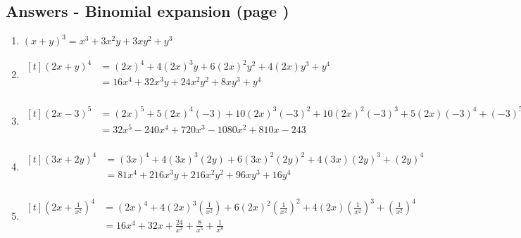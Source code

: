 \documentclass[../main.tex]{subfiles}
\begin{document}
\subsection*{Answers - Binomial expansion (page \pageref{Binomial Expansion})}
\label{Binomial expansion answers}

\begin{enumerate}
    \item \( (x+y)^3 = x^3 + 3x^2 y + 3xy^2 +y^3 \)
    \item 
    $
    \!
    \begin{aligned}[t]
     (2x+y)^4 
        &= (2x)^4 + 4(2x)^3y + 6(2x)^2y^2 + 4(2x)y^3 + y^4 \\
        &= 16x^4 + 32x^3y + 24x^2y^2 + 8xy^3 + y^4 \\
    \end{aligned}
    $ 
    \item 
    $
    \!
    \begin{aligned}[t]
     (2x-3)^5 
        &= (2x)^5 + 5(2x)^4(-3) + 10(2x)^3(-3)^2 + 10(2x)^2(-3)^3 + 5(2x)(-3)^4 + (-3)^5 \\
        &= 32x^5 -240x^4 +720x^3 - 1080x^2 + 810x - 243 \\
    \end{aligned}
    $

    \item 
    $
    \!
    \begin{aligned}[t]
     (3x+2y)^4 
        &= (3x)^4 + 4(3x)^3(2y) + 6(3x)^2(2y)^2 + 4(3x)(2y)^3 + (2y)^4 \\
        &= 81x^4 +216x^3y +216x^2y^2 + 96xy^3 + 16y^4 \\
    \end{aligned}
    $

    \item 
    $
    \!
    \begin{aligned}[t]
     (2x + \frac{1}{x^2} )^4 
        &= (2x)^4 + 4(2x)^3(\frac{1}{x^2}) + 6(2x)^2(\frac{1}{x^2})^2 + 4(2x)(\frac{1}{x^2})^3 + (\frac{1}{x^2})^4 \\
        &= 16x^4 + 32x + \frac{24}{x^2} + \frac{8}{x^5} + \frac{1}{x^8}\\
    \end{aligned}
    $
    

\end{enumerate}
\end{document}
